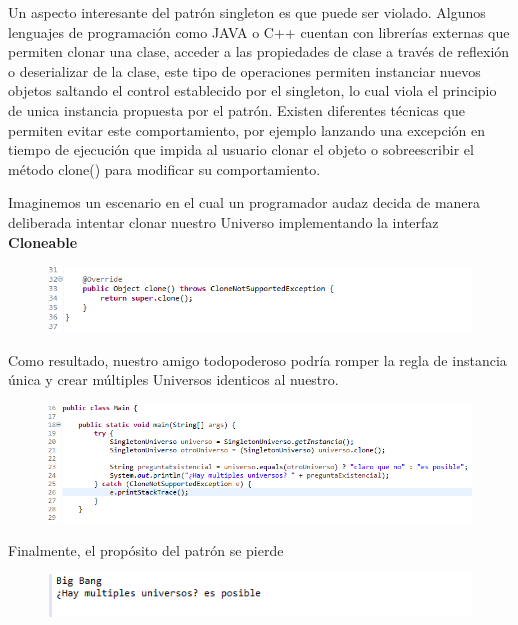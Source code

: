 Un aspecto interesante del patrón singleton es que puede ser violado. Algunos lenguajes de programación como JAVA o C++ cuentan con librerías externas que permiten clonar una clase, acceder a las propiedades de clase a través de reflexión o deserializar de la clase, este tipo de operaciones permiten instanciar nuevos objetos saltando el control establecido por el singleton, lo cual viola el principio de unica instancia propuesta por el patrón. Existen diferentes técnicas que permiten evitar este comportamiento, por ejemplo lanzando una excepción en tiempo de ejecución que impida al usuario clonar el objeto o sobreescribir el método clone() para modificar su comportamiento.

Imaginemos un escenario en el cual un programador audaz decida de manera deliberada intentar clonar nuestro Universo implementando la interfaz \textbf{Cloneable}

\begin{figure}[H]
	\includegraphics{images/creational/singleton/singletonExample6.png}
\end{figure}

Como resultado, nuestro amigo todopoderoso podría romper la regla de instancia única y crear múltiples Universos identicos al nuestro.

\begin{figure}[H]
	\includegraphics{images/creational/singleton/singletonExample7.png}
\end{figure}

Finalmente, el propósito del patrón se pierde

\begin{figure}[H]
	\includegraphics{images/creational/singleton/singletonExample8.png}
\end{figure}

